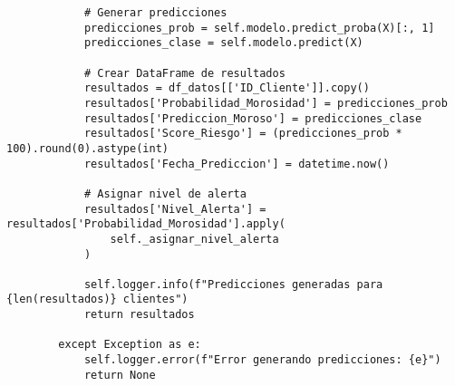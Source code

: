 \begin{verbatim}
            # Generar predicciones
            predicciones_prob = self.modelo.predict_proba(X)[:, 1]
            predicciones_clase = self.modelo.predict(X)
            
            # Crear DataFrame de resultados
            resultados = df_datos[['ID_Cliente']].copy()
            resultados['Probabilidad_Morosidad'] = predicciones_prob
            resultados['Prediccion_Moroso'] = predicciones_clase
            resultados['Score_Riesgo'] = (predicciones_prob * 100).round(0).astype(int)
            resultados['Fecha_Prediccion'] = datetime.now()
            
            # Asignar nivel de alerta
            resultados['Nivel_Alerta'] = resultados['Probabilidad_Morosidad'].apply(
                self._asignar_nivel_alerta
            )
            
            self.logger.info(f"Predicciones generadas para {len(resultados)} clientes")
            return resultados
            
        except Exception as e:
            self.logger.error(f"Error generando predicciones: {e}")
            return None
\end{verbatim}

